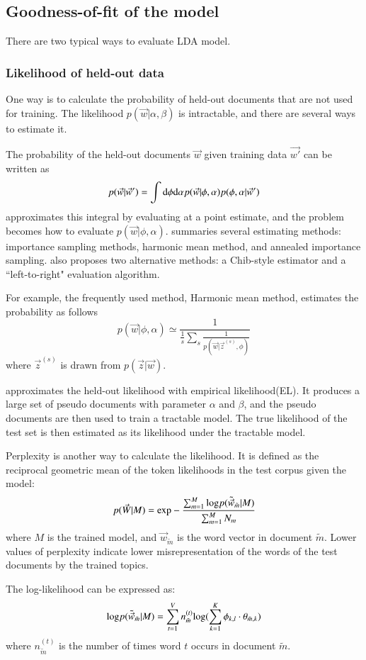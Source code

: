 \documentclass{article} %
\begin{document}
\subsection{Goodness-of-fit of the model}
There are two typical ways to evaluate LDA model. 
\subsubsection{Likelihood of held-out data}
\label{section11}
One way is to calculate the probability of held-out documents that are not used for training. The likelihood $p(\vec{w} | \alpha, \beta)$ is intractable, and there are several ways to estimate it.
\par
The probability of the held-out documents $\vec{w}$ given training data $\vec{w'}$ can be written as
\begin{equation}
p(\vec{w}|\vec{w}') = \int \textup{d}\phi \textup{d}\alpha p(\vec{w}| \phi, \alpha)p(\phi, \alpha|\vec{w}')
\end{equation}
 \cite{hanna} approximates this integral by evaluating at a point estimate, and the problem becomes how to evaluate $p(\vec{w}| \phi, \alpha)$. \cite{hanna} summaries several estimating methods: importance sampling methods, harmonic mean method, and annealed importance sampling. \cite{hanna} also proposes two alternative methods: a Chib-style estimator and a ``left-to-right" evaluation algorithm.
\par For example, the frequently used method, Harmonic mean method, estimates the probability as follows
 \begin{equation}
p(\vec{w}| \phi, \alpha) \simeq \frac{1}{\frac{1}{s}\sum _{s}\frac{1}{p(\vec{w}|\vec{z}^{(s)}, \phi)}}
\end{equation}
where $\vec{z}^{(s)}$ is drawn from $p(\vec{z}|\vec{w})$. 
\par
\cite{gabriel} approximates the held-out likelihood with empirical likelihood(EL). It produces a large set of pseudo documents with parameter $\alpha$ and $\beta$, and the pseudo documents are then used to train a tractable model.
 The true likelihood of the test set is then estimated as its likelihood under the tractable model. 
 \par
 Perplexity is another way to calculate the likelihood. It is defined as the reciprocal geometric mean of the token likelihoods in the test corpus given the model:
 \begin{equation}
 p(\vec{W}|M)=\textup{exp}-\frac{\sum_{m=1}^{M}\textup{log}p(\tilde{\vec{w}}_{\tilde{m}}|M)}{\sum_{m=1}^{M}N_{m}}
 \end{equation}
where $M$ is the trained model, and $\vec{w}_{\tilde{m}}$ is the word vector in document $\tilde{m}$. Lower values of perplexity indicate lower misrepresentation of the words of the test documents by the trained topics.
 \par
 The log-likelihood can be expressed as:
 \begin{equation}
 \textup{log}p(\tilde{\vec{w}}_{\tilde{m}}|M) = \sum_{t=1}^{V}n^{(t)}_{\tilde{m}}\textup{log}(\sum_{k=1}^{K}\phi_{k,l}\cdot\theta_{\tilde{m},k})
 \end{equation}
 where $n^{(t)}_{\tilde{m}}$ is the number of times word $t$ occurs in document $\tilde{m}$.
 
\end{document}
